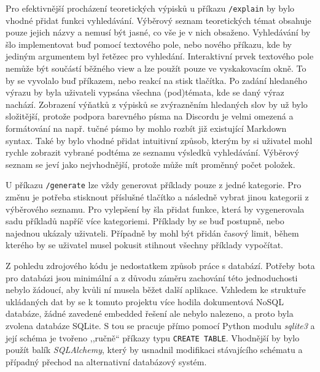 \documentclass[FM]{tulthesis}
\begin{document}
	Pro efektivnější procházení teoretických výpisků u příkazu \verb|/explain| by bylo vhodné přidat funkci vyhledávání. Výběrový seznam teoretických témat obsahuje pouze jejich názvy a nemusí být jasné, co vše je v nich obsaženo. Vyhledávání by šlo implementovat buď pomocí textového pole, nebo nového příkazu, kde by jediným argumentem byl řetězec pro vyhledání. Interaktivní prvek textového pole nemůže být součástí běžného view a lze použít pouze ve vyskakovacím okně. To by se vyvolalo buď příkazem, nebo reakcí na stisk tlačítka. Po zadání hledaného výrazu by byla uživateli vypsána všechna (pod)témata, kde se daný výraz nachází. Zobrazení výňatků z výpisků se zvýrazněním hledaných slov by už bylo složitější, protože podpora barevného písma na Discordu je velmi omezená a formátování na např. tučné písmo by mohlo rozbít již existující Markdown syntax. Také by bylo vhodné přidat intuitivní způsob, kterým by si uživatel mohl rychle zobrazit vybrané podtéma ze seznamu výsledků vyhledávání. Výběrový seznam se jeví jako nejvhodnější, protože může mít proměnný počet položek.
	
	U příkazu \verb|/generate| lze vždy generovat příklady pouze z jedné kategorie. Pro změnu je potřeba stisknout příslušné tlačítko a následně vybrat jinou kategorii z výběrového seznamu. Pro vylepšení by šla přidat funkce, která by vygenerovala sadu příkladů napříč více kategoriemi. Příklady by se buď postupně, nebo najednou ukázaly uživateli. Případně by mohl být přidán časový limit, během kterého by se uživatel musel pokusit stihnout všechny příklady vypočítat.
	
	Z pohledu zdrojového kódu je nedostatkem způsob práce s databází. Potřeby bota pro databázi jsou minimální a z důvodu záměru zachování této jednoduchosti nebylo žádoucí, aby kvůli ní musela běžet další aplikace. Vzhledem ke struktuře ukládaných dat by se k tomuto projektu více hodila dokumentová NoSQL databáze, žádné zavedené embedded řešení ale nebylo nalezeno, a proto byla zvolena databáze SQLite. S tou se pracuje přímo pomocí Python modulu \textit{sqlite3} a její schéma je tvořeno ,,ručně`` příkazy typu \verb|CREATE TABLE|. Vhodnější by bylo použít balík \textit{SQLAlchemy}, který by usnadnil modifikaci stávajícího schématu a případný přechod na alternativní databázový systém.
	
		
\end{document}
